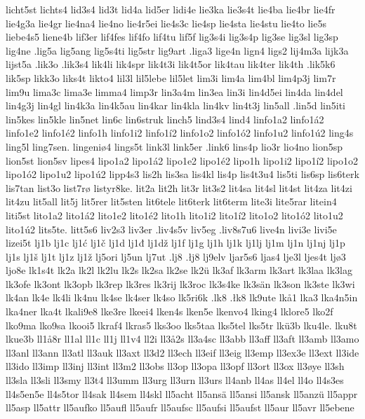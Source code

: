 {{licht5st
lichts4
lid3s4
lid3t
lid4a
lid5er
lidi4e
lie3ka
lie3s4t
lie4ba
lie4br
lie4fr
lie4g3a
lie4gr
lie4na4
lie4no
lie4r5ei
lie4s3c
lie4sp
lie4sta
lie4stu
lie4to
lie5s
liebe4s5
liene4b
lif3er
lif4fes
lif4fo
lif4tu
lif5f
lig3s4i
lig3s4p
lig3se
lig3sl
lig3sp
lig4ne
.lig5a
lig5ang
lig5s4ti
lig5str
lig9art
.liga3
lige4n
lign4
ligs2
lij4m3a
lijk3a
lijst5a
.lik3o
.lik3s4
lik4li
lik4spr
lik4t3i
lik4t5or
lik4tau
lik4ter
lik4th
.lik5k6
lik5sp
likk3o
liks4t
likto4
lil3l
lil5lebe
lil5let
lim3i
lim4a
lim4bl
lim4p3j
lim7r
lim9u
lima3c
lima3e
limma4
limp3r
lin3a4m
lin3ea
lin3i
lin4d5ei
lin4da
lin4del
lin4g3j
lin4gl
lin4k3a
lin4k5au
lin4kar
lin4kla
lin4kv
lin4t3j
lin5all
.lin5d
lin5iti
lin5kes
lin5kle
lin5net
lin6c
lin6struk
linch5
lind3s4
lind4
linfo1a2
linfo1á2
linfo1e2
linfo1é2
linfo1h
linfo1i2
linfo1í2
linfo1o2
linfo1ó2
linfo1u2
linfo1ú2
ling4s
ling5l
ling7sen.
lingeniø4
lings5t
link3l
link5er
.link6
lins4p
lio3r
lio4no
lion5sp
lion5st
lion5sv
lipes4
lipo1a2
lipo1á2
lipo1e2
lipo1é2
lipo1h
lipo1i2
lipo1í2
lipo1o2
lipo1ó2
lipo1u2
lipo1ú2
lipp4s3
lis2h
lis3sa
lis4kl
lis4p
lis4t3u4
lis5ti
lis6sp
lis6terk
lis7tan
list3o
list7rø
listyr8ke.
lit2a
lit2h
lit3r
lit3s2
lit4sa
lit4sl
lit4st
lit4za
lit4zi
lit4zu
lit5all
lit5j
lit5rer
lit5sten
lit6tele
lit6terk
lit6term
lite3i
lite5rar
litein4
liti5st
lito1a2
lito1á2
lito1e2
lito1é2
lito1h
lito1i2
lito1í2
lito1o2
lito1ó2
lito1u2
lito1ú2
lits5te.
litt5s6
liv2s3
liv3er
.liv4s5v
liv5eg
.liv8s7u6
live4n
livi3e
livi5e
lizei5t
lj1b
lj1c
lj1ć
lj1č
lj1d
lj1đ
lj1dž
lj1f
lj1g
lj1h
lj1k
lj1lj
lj1m
lj1n
lj1nj
lj1p
lj1s
lj1š
lj1t
lj1z
lj1ž
lj5ori
lj5un
lj7ut
.lj8
.łj8
lj9elv
ljar5s6
ljas4
lje3l
ljes4t
ljø3
ljo8e
lk1s4t
lk2a
lk2l
lk2lu
lk2s
lk2sa
lk2se
lk2ü
lk3af
lk3arm
lk3art
lk3laa
lk3lag
lk3ofe
lk3ont
lk3opb
lk3rep
lk3res
lk3rij
lk3roc
lk3s4ke
lk3sän
lk3son
lk3ste
lk3wi
lk4an
lk4e
lk4li
lk4nu
lk4se
lk4ser
lk4so
lk5ri6k
.lk8
.łk8
lk9ute
lkå1
lka3
lka4n5in
lka4ner
lka4t
lkali9e8
lke3re
lkeei4
lken4s
lken5e
lkenvo4
lking4
lklore5
lko2f
lko9ma
lko9sa
lkooi5
lkraf4
lkras5
lks3oo
lks5taa
lks5tel
lks5tr
lkü3b
lku4le.
lku8t
lkue3b
ll1å8r
ll1al
ll1c
ll1j
ll1v4
ll2i
ll3å2s
ll3a4sc
ll3abb
ll3aff
ll3aft
ll3amb
ll3amo
ll3anl
ll3ann
ll3atl
ll3auk
ll3axt
ll3d2
ll3ech
ll3eif
ll3eig
ll3emp
ll3ex3e
ll3ext
ll3ide
ll3ido
ll3imp
ll3inj
ll3int
ll3m2
ll3obs
ll3op
ll3opa
ll3opf
ll3ort
ll3ox
ll3øye
ll3sh
ll3sla
ll3sli
ll3smy
ll3t4
ll3umm
ll3urg
ll3urn
ll3urs
ll4anb
ll4as
ll4el
ll4o
ll4s3es
ll4s5en5e
ll4s5tor
ll4sak
ll4sem
ll4skl
ll5acht
ll5ansä
ll5ansi
ll5ansk
ll5anzü
ll5appr
ll5asp
ll5attr
ll5aufko
ll5aufl
ll5aufr
ll5aufsc
ll5aufsi
ll5aufst
ll5aur
ll5avr
ll5ebene
}}
